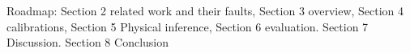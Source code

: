 Roadmap: Section 2 related work and their faults, Section 3 overview, Section 4 calibrations, Section 5 Physical inference, 
Section 6 evaluation. Section 7 Discussion. Section 8 Conclusion







